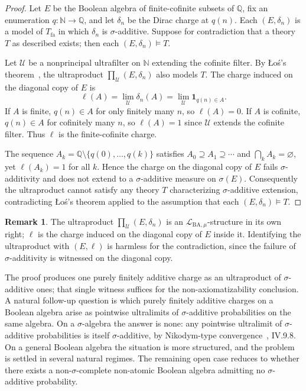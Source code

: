 \documentclass{amsproc}
\theoremstyle{definition}
\newtheorem{remark}[proposition]{Remark}
\newcommand{\Lmu}{\mathcal{L}_{\mathrm{BA},\mu}}
\newcommand{\Tfa}{T_{\mathrm{fa}}}
\newcommand{\Q}{\mathbb{Q}}
\newcommand{\N}{\mathbb{N}}
\begin{document}
\begin{proof}
Let $E$ be the Boolean algebra of finite-cofinite subsets of $\Q$, fix an
enumeration $q : \N \to \Q$, and let $\delta_n$ be the Dirac charge at
$q(n)$.  Each $(E, \delta_n)$ is a model of $\Tfa$ in which $\delta_n$ is
$\sigma$-additive.  Suppose for contradiction that a theory $T$ as described
exists; then each $(E, \delta_n) \models T$.

Let $\mathcal{U}$ be a nonprincipal ultrafilter on $\N$ extending the
cofinite filter.  By \L{}o\'{s}'s theorem~\cite{Los1955}, the ultraproduct
$\prod_\mathcal{U}(E,\delta_n)$ also models $T$.  The charge induced on the
diagonal copy of $E$ is
\[
  \ell(A) = \lim_\mathcal{U} \delta_n(A) = \lim_\mathcal{U}
  \mathbf{1}_{q(n) \in A}.
\]
If $A$ is finite, $q(n) \in A$ for only finitely many $n$, so $\ell(A) = 0$.
If $A$ is cofinite, $q(n) \in A$ for cofinitely many $n$, so $\ell(A) = 1$
since $\mathcal{U}$ extends the cofinite filter.  Thus $\ell$ is the
finite-cofinite charge.

The sequence $A_k = \Q \setminus \{q(0), \ldots, q(k)\}$ satisfies
$A_0 \supseteq A_1 \supseteq \cdots$ and $\bigcap_k A_k = \varnothing$, yet
$\ell(A_k) = 1$ for all $k$.  Hence the charge on the diagonal copy of $E$
fails $\sigma$-additivity and does not extend to a $\sigma$-additive measure
on $\sigma(E)$.  Consequently the ultraproduct cannot satisfy any theory $T$
characterizing $\sigma$-additive extension, contradicting \L{}o\'{s}'s
theorem applied to the assumption that each $(E, \delta_n) \models T$.
\end{proof}

\begin{remark}
The ultraproduct $\prod_\mathcal{U}(E,\delta_n)$ is an $\Lmu$-structure in
its own right; $\ell$ is the charge induced on the diagonal copy of $E$
inside it.  Identifying the ultraproduct with $(E,\ell)$ is harmless for the
contradiction, since the failure of $\sigma$-additivity is witnessed on the
diagonal copy.
\end{remark}

\medskip

The proof produces one purely finitely additive charge as an ultraproduct of
$\sigma$-additive ones; that single witness suffices for the
non-axiomatizability conclusion.  A natural follow-up question is which
purely finitely additive charges on a Boolean algebra arise as pointwise
ultralimits of $\sigma$-additive probabilities on the same algebra.  On a
$\sigma$-algebra the answer is none: any pointwise ultralimit of
$\sigma$-additive probabilities is itself $\sigma$-additive, by Nikodym-type
convergence~\cite{DunfordSchwartz1958}, IV.9.8.  On a general Boolean algebra
the situation is more structured, and the problem is settled in several
natural regimes.  The remaining open case reduces to whether there exists a
non-$\sigma$-complete non-atomic Boolean algebra admitting no $\sigma$-additive
probability.
\end{document}
